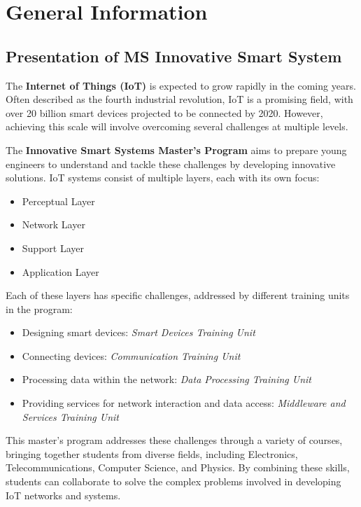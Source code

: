 \chapter{General Information}

\section{Presentation of MS Innovative Smart System}

The \textbf{Internet of Things (IoT)} is expected to grow rapidly in the coming years. Often described as the fourth industrial revolution, IoT is a promising field, with over 20 billion smart devices projected to be connected by 2020. However, achieving this scale will involve overcoming several challenges at multiple levels. 

The \textbf{Innovative Smart Systems Master’s Program} aims to prepare young engineers to understand and tackle these challenges by developing innovative solutions. IoT systems consist of multiple layers, each with its own focus:

\begin{itemize}
    \item Perceptual Layer
    \item Network Layer
    \item Support Layer
    \item Application Layer
\end{itemize}

Each of these layers has specific challenges, addressed by different training units in the program:

\begin{itemize}
\item Designing smart devices: \textit{Smart Devices Training Unit}
\item Connecting devices: \textit{Communication Training Unit}
\item Processing data within the network: \textit{Data Processing Training Unit}
\item Providing services for network interaction and data access: \textit{Middleware and Services Training Unit}
\end{itemize}

This master’s program addresses these challenges through a variety of courses, bringing together students from diverse fields, including Electronics, Telecommunications, Computer Science, and Physics. By combining these skills, students can collaborate to solve the complex problems involved in developing IoT networks and systems.

